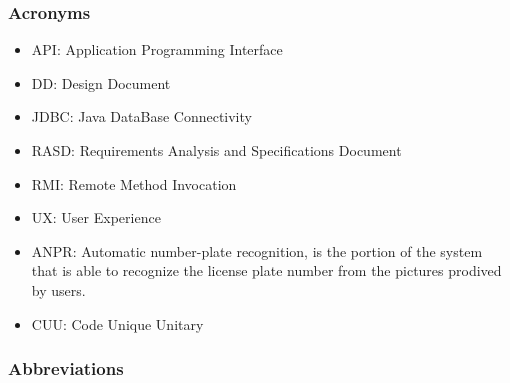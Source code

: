 \subsubsection{Acronyms}
\begin{itemize}
	\item
	API: Application Programming Interface
	\item
	DD: Design Document
	\item
	JDBC: Java DataBase Connectivity
	\item
	RASD: Requirements Analysis and Specifications Document
	\item
	RMI: Remote Method Invocation
	\item
	UX: User Experience
	\item
	ANPR: Automatic number-plate recognition, is the portion of the system
	that is able to recognize the license plate number from the pictures prodived
	by users.
	\item
	CUU: Code Unique Unitary
	
\end{itemize}

\subsubsection{Abbreviations}